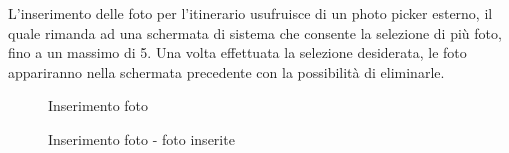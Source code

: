 \documentclass{natourDoc}
\begin{document}
\newpage
L'inserimento delle foto per l'itinerario usufruisce di un photo picker esterno, il quale rimanda ad una schermata di sistema
che consente la selezione di più foto, fino a un massimo di 5. Una volta effettuata la selezione desiderata, le foto appariranno
nella schermata precedente con la possibilità di eliminarle.
\begin{figure}[htbp]
	\centering
	\begin{minipage}[t]{0.4\textwidth}
		\caption{Inserimento foto}
	\end{minipage}
	\hfill
	\begin{minipage}[t]{0.4\textwidth}
		\caption{Inserimento foto - foto inserite}
	\end{minipage}
\end{figure}
\end{document}
